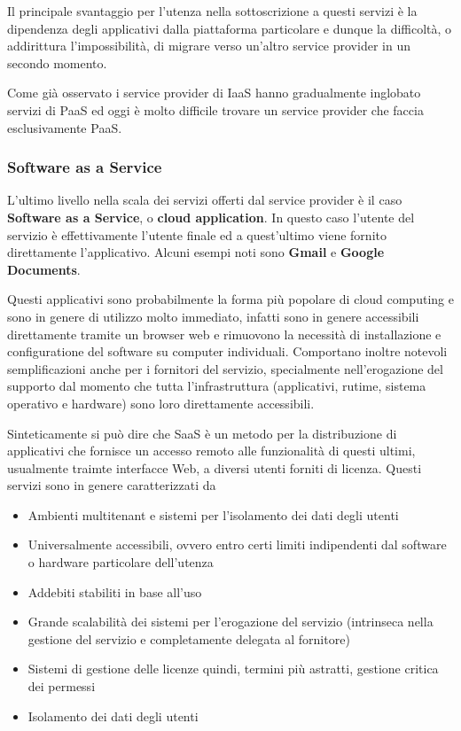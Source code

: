 \documentclass[italian,]{article}
\providecommand{\tightlist}{%
  \setlength{\itemsep}{0pt}\setlength{\parskip}{0pt}}
\begin{document}
Il principale svantaggio per l'utenza nella sottoscrizione a questi
servizi è la dipendenza degli applicativi dalla piattaforma particolare
e dunque la difficoltà, o addirittura l'impossibilità, di migrare verso
un'altro service provider in un secondo momento.

Come già osservato i service provider di IaaS hanno gradualmente
inglobato servizi di PaaS ed oggi è molto difficile trovare un service
provider che faccia esclusivamente PaaS.

\subsubsection{Software as a Service}\label{software-as-a-service}

L'ultimo livello nella scala dei servizi offerti dal service provider è
il caso \textbf{Software as a Service}, o \textbf{cloud application}. In
questo caso l'utente del servizio è effettivamente l'utente finale ed a
quest'ultimo viene fornito direttamente l'applicativo. Alcuni esempi
noti sono \textbf{Gmail} e \textbf{Google Documents}.

Questi applicativi sono probabilmente la forma più popolare di cloud
computing e sono in genere di utilizzo molto immediato, infatti sono in
genere accessibili direttamente tramite un browser web e rimuovono la
necessità di installazione e configuratione del software su computer
individuali. Comportano inoltre notevoli semplificazioni anche per i
fornitori del servizio, specialmente nell'erogazione del supporto dal
momento che tutta l'infrastruttura (applicativi, rutime, sistema
operativo e hardware) sono loro direttamente accessibili.

Sinteticamente si può dire che SaaS è un metodo per la distribuzione di
applicativi che fornisce un accesso remoto alle funzionalità di questi
ultimi, usualmente traimte interfacce Web, a diversi utenti forniti di
licenza. Questi servizi sono in genere caratterizzati da

\begin{itemize}
\tightlist
\item
  Ambienti multitenant e sistemi per l'isolamento dei dati degli utenti
\item
  Universalmente accessibili, ovvero entro certi limiti indipendenti dal
  software o hardware particolare dell'utenza
\item
  Addebiti stabiliti in base all'uso
\item
  Grande scalabilità dei sistemi per l'erogazione del servizio
  (intrinseca nella gestione del servizio e completamente delegata al
  fornitore)
\item
  Sistemi di gestione delle licenze quindi, termini più astratti,
  gestione critica dei permessi
\item
  Isolamento dei dati degli utenti
\end{itemize}
\end{document}
